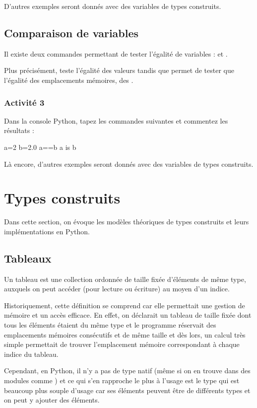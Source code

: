 \documentclass[11pt,a4paper,french,twoside]{PMCours}
\begin{document}
\bigskip
D'autres exemples seront donnés avec des variables de types construits.

\subsection{Comparaison de variables}
Il existe deux commandes permettant de tester l'égalité de variables : \code{==} 
et .

Plus précisément, \code{==} teste l'égalité des valeurs tandis que  
permet de tester que l'égalité des emplacements mémoires, des .

\subsubsection*{Activité 3}
Dans la console Python, tapez les commandes suivantes et commentez les résultats :
\begin{Python}
a=2
b=2.0
a==b
a is b
\end{Python}

Là encore, d'autres exemples seront donnés avec des variables de types construits.

\section{Types construits}
Dans cette section, on évoque les modèles théoriques de types construits et leurs 
implémentations en Python. 
\subsection{Tableaux}
\begin{Definition}{}
Un tableau est une collection ordonnée de taille fixée d'éléments de même type, 
auxquels on peut accéder (pour lecture ou écriture) au moyen d'un indice.  
\end{Definition}

\medskip
Historiquement, cette définition se comprend car elle permettait
une gestion de mémoire et un accès efficace.
En effet, on déclarait un tableau de taille fixée dont tous les éléments étaient 
du même type et le programme réservait des emplacements mémoires consécutifs 
et de même taille et dès lors, un calcul très simple permettait de trouver 
l'emplacement mémoire correspondant à chaque indice du tableau.

\medskip
Cependant, en Python, il n'y a pas de type  natif (même si on en 
trouve dans des modules comme ) et ce qui s'en rapproche le plus à 
l'usage est le type   
qui est beaucoup plus souple d'usage car ses éléments peuvent être de différents 
types et on peut y ajouter des éléments.
\end{document}
